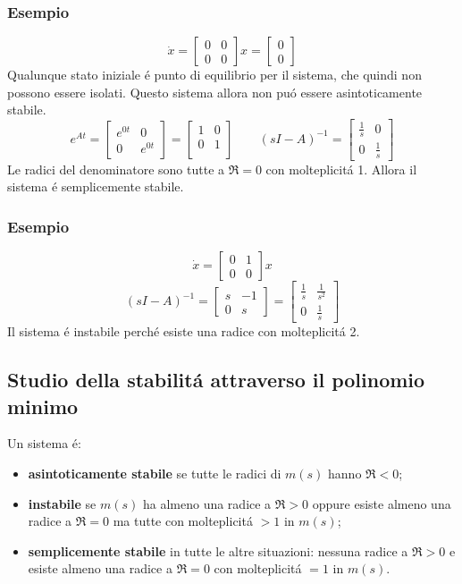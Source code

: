 \documentclass[../main.tex]{subfiles}
\begin{document}
	\subsubsection*{Esempio}
		\[ \dot x =
			\begin{bmatrix}
				0 & 0\\
				0 & 0
			\end{bmatrix} x = \begin{bmatrix} 0\\ 0 \end{bmatrix}
		\]
		Qualunque stato iniziale \'e punto di equilibrio per il sistema, che quindi non possono essere isolati. Questo sistema allora non pu\'o essere asintoticamente stabile.
		\[ e^{At} =
			\begin{bmatrix} e^{0t} & 0\\ 0 & e^{0t} \end{bmatrix} =
			\begin{bmatrix} 1 & 0\\ 0 & 1\\ \end{bmatrix} \qquad
			(sI-A)^{-1} = \begin{bmatrix} \frac{1}{s} & 0\\ 0 & \frac{1}{s} \end{bmatrix}
		\]
		Le radici del denominatore sono tutte a $ \Re = 0 $ con molteplicit\'a 1. Allora il sistema \'e semplicemente stabile.
		
	\subsubsection*{Esempio}
		\[ 
			\dot x = \begin{bmatrix} 0 & 1\\ 0 & 0 \end{bmatrix} x
		\]
		\[
			(sI-A)^{-1} = \begin{bmatrix} s & -1\\ 0 & s \end{bmatrix} = \begin{bmatrix} \frac{1}{s} & \frac{1}{s^2}\\ 0 & \frac{1}{s} \end{bmatrix}
		\]
		Il sistema \'e instabile perch\'e esiste una radice con molteplicit\'a 2.
		
	\subsection{Studio della stabilit\'a attraverso il polinomio minimo}
		Un sistema \'e:
		\begin{itemize}
			\item
				\textbf{asintoticamente stabile} se tutte le radici di $ m(s) $ hanno $ \Re < 0 $;
			\item
				\textbf{instabile} se $ m(s) $ ha almeno una radice a $ \Re > 0 $ oppure esiste almeno una radice a $ \Re = 0 $ ma tutte con molteplicit\'a $ >1 $ in $ m(s) $;
			\item
				\textbf{semplicemente stabile} in tutte le altre situazioni: nessuna radice a $ \Re > 0 $ e esiste almeno una radice a $ \Re = 0 $ con molteplicit\'a $ =1 $ in $ m(s) $.
		\end{itemize}
	
\end{document}
